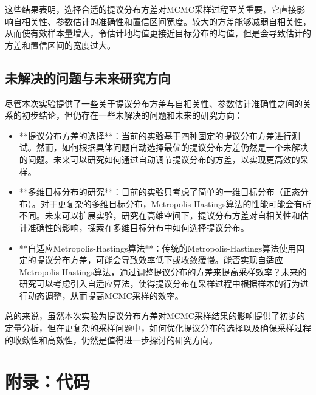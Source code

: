 \documentclass[12pt]{article}
\begin{document}
这些结果表明，选择合适的提议分布方差对MCMC采样过程至关重要，它直接影响自相关性、参数估计的准确性和置信区间宽度。较大的方差能够减弱自相关性，从而使有效样本量增大，令估计地均值更接近目标分布的均值，但是会导致估计的方差和置信区间的宽度过大。

\subsection{未解决的问题与未来研究方向}

尽管本次实验提供了一些关于提议分布方差与自相关性、参数估计准确性之间的关系的初步结论，但仍存在一些未解决的问题和未来的研究方向：

\begin{itemize}
	\item **提议分布方差的选择**：当前的实验基于四种固定的提议分布方差进行测试。然而，如何根据具体问题自动选择最优的提议分布方差仍然是一个未解决的问题。未来可以研究如何通过自动调节提议分布的方差，以实现更高效的采样。
	\item **多维目标分布的研究**：目前的实验只考虑了简单的一维目标分布（正态分布）。对于更复杂的多维目标分布，Metropolis-Hastings算法的性能可能会有所不同。未来可以扩展实验，研究在高维空间下，提议分布方差对自相关性和估计准确性的影响，探索在多维目标分布中如何选择提议分布。
	\item **自适应Metropolis-Hastings算法**：传统的Metropolis-Hastings算法使用固定的提议分布方差，可能会导致效率低下或收敛缓慢。能否实现自适应Metropolis-Hastings算法，通过调整提议分布的方差来提高采样效率？未来的研究可以考虑引入自适应算法，使得提议分布在采样过程中根据样本的行为进行动态调整，从而提高MCMC采样的效率。
\end{itemize}

总的来说，虽然本次实验为提议分布方差对MCMC采样结果的影响提供了初步的定量分析，但在更复杂的采样问题中，如何优化提议分布的选择以及确保采样过程的收敛性和高效性，仍然是值得进一步探讨的研究方向。








\clearpage

\appendix
\section{附录：代码}
\end{document}
